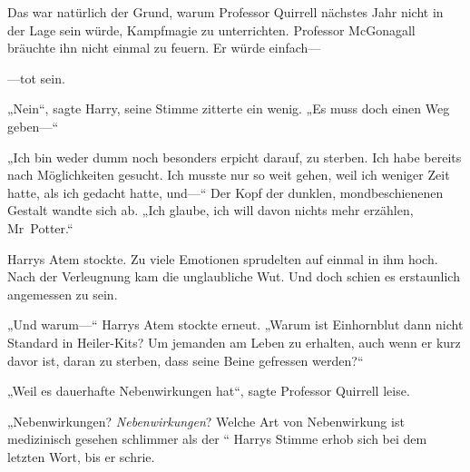 Das war natürlich der Grund, warum Professor Quirrell nächstes Jahr nicht in der Lage sein würde, Kampfmagie zu unterrichten. Professor McGonagall bräuchte ihn nicht einmal zu feuern. Er würde einfach—

—tot sein.

„Nein“, sagte Harry, seine Stimme zitterte ein wenig. „Es muss doch einen Weg geben—“

„Ich bin weder dumm noch besonders erpicht darauf, zu sterben. Ich habe bereits nach Möglichkeiten gesucht. Ich musste nur so weit gehen, weil ich weniger Zeit hatte, als ich gedacht hatte, und—“ Der Kopf der dunklen, mondbeschienenen Gestalt wandte sich ab. „Ich glaube, ich will davon nichts mehr erzählen, Mr~Potter.“

Harrys Atem stockte. Zu viele Emotionen sprudelten auf einmal in ihm hoch. Nach der Verleugnung kam die unglaubliche Wut. Und doch schien es erstaunlich angemessen zu sein.

„Und warum—“ Harrys Atem stockte erneut. „Warum ist Einhornblut dann nicht Standard in Heiler-Kits? Um jemanden am Leben zu erhalten, auch wenn er kurz davor ist, daran zu sterben, dass seine Beine gefressen werden?“

„Weil es dauerhafte Nebenwirkungen hat“, sagte Professor Quirrell leise.

„Nebenwirkungen? \emph{Nebenwirkungen}? Welche Art von Nebenwirkung ist medizinisch gesehen schlimmer als der “ Harrys Stimme erhob sich bei dem letzten Wort, bis er schrie.

